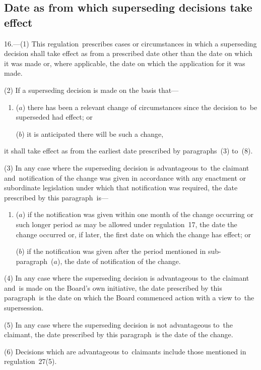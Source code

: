 \documentclass[12pt,a4paper]{article}
\begin{document}
\subsection[16. Date as from which superseding decisions take effect]{Date as from which superseding decisions take effect}

16.---(1)  This regulation~prescribes cases or circumstances in which a superseding decision shall take effect as from a prescribed date other than the date on which it was made or, where applicable, the date on which the application for it was made.

(2) If a superseding decision is made on the basis that—
\begin{enumerate}\item[]
($a$) there has been a relevant change of circumstances since the decision to~be superseded had effect; or

($b$) it is anticipated there will be such a change,
\end{enumerate}
it shall take effect as from the earliest date prescribed by paragraphs~(3) to~(8).

(3) In any case where the superseding decision is advantageous to~the claimant and~notification of the change was given in accordance with any enactment or subordinate legislation under which that notification was required, the date prescribed by this paragraph~is—
\begin{enumerate}\item[]
($a$) if the notification was given within one month of the change occurring or such longer period as may be allowed under regulation~17, the date the change occurred or, if later, the first date on which the change has effect; or

($b$) if the notification was given after the period mentioned in sub-paragraph~($a$), the date of notification of the change.
\end{enumerate}

(4) In any case where the superseding decision is advantageous to~the claimant and~is made on the Board’s own initiative, the date prescribed by this paragraph~is the date on which the Board commenced action with a view to~the supersession.

(5) In any case where the superseding decision is not advantageous to~the claimant, the date prescribed by this paragraph~is the date of the change.

(6) Decisions which are advantageous to~claimants include those mentioned in regulation~27(5).
\end{document}
